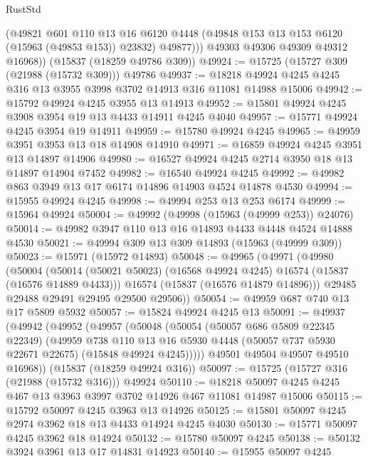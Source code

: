\begin{lexlean}{RustStd}
\begin{coremodule}
{\begin{coremodule}
{{{{{{{{{{{{{{{{{{{{{{{{{{{{{{{{{{{{{{{{{{{{{{{{{{{{{{{{{{{{            (@49821
              @601
              @110
              @13
              @16
              @6120
              @4448
              (@49848 @153 @13 @153 @6120 (@15963 (@49853 @153)) @23832)
              @49877)))
        @49303
        @49306
        @49309
        @49312
        @16968))
    (@15837 (@18259 @49786 @309))
@49924 := @15725 (@15727 @309 (@21988 (@15732 @309))) @49786
@49937 := @18218 @49924 @4245 @4245 @316 @13 @3955 @3998 @3702 @14913 @316 @11081 @14988 @15006
@49942 := @15792 @49924 @4245 @3955 @13 @14913
@49952 := @15801 @49924 @4245 @3908 @3954 @19 @13 @4433 @14911 @4245 @4040
@49957 := @15771 @49924 @4245 @3954 @19 @14911
@49959 := @15780 @49924 @4245
@49965 := @49959 @3951 @3953 @13 @18 @14908 @14910
@49971 := @16859 @49924 @4245 @3951 @13 @14897 @14906
@49980 := @16527 @49924 @4245 @2714 @3950 @18 @13 @14897 @14904 @7452
@49982 := @16540 @49924 @4245
@49992 := @49982 @863 @3949 @13 @17 @6174 @14896 @14903 @4524 @14878 @4530
@49994 := @15955 @49924 @4245
@49998 := @49994 @253 @13 @253 @6174
@49999 := @15964 @49924
@50004 := @49992 (@49998 (@15963 (@49999 @253)) @24076)
@50014 := @49982 @3947 @110 @13 @16 @14893 @4433 @4448 @4524 @14888 @4530
@50021 := @49994 @309 @13 @309 @14893 (@15963 (@49999 @309))
@50023 := @15971 (@15972 @14893)
@50048 := @49965
    (@49971
      (@49980
        (@50004
          (@50014 (@50021 @50023) (@16568 @49924 @4245) @16574 (@15837 (@16576 @14889 @4433)))
          @16574
          (@15837 (@16576 @14879 @14896)))
        @29485
        @29488
        @29491
        @29495
        @29500
        @29506))
@50054 := @49959 @687 @740 @13 @17 @5809 @5932
@50057 := @15824 @49924 @4245 @13
@50091 := @49937
    (@49942
      (@49952
        (@49957
          (@50048
            (@50054
              (@50057 @686 @5809 @22345 @22349)
              (@49959
                @738
                @110
                @13
                @16
                @5930
                @4448
                (@50057 @737 @5930 @22671 @22675)
                (@15848 @49924 @4245)))))
        @49501
        @49504
        @49507
        @49510
        @16968))
    (@15837 (@18259 @49924 @316))
@50097 := @15725 (@15727 @316 (@21988 (@15732 @316))) @49924
@50110 := @18218 @50097 @4245 @4245 @467 @13 @3963 @3997 @3702 @14926 @467 @11081 @14987 @15006
@50115 := @15792 @50097 @4245 @3963 @13 @14926
@50125 := @15801 @50097 @4245 @2974 @3962 @18 @13 @4433 @14924 @4245 @4030
@50130 := @15771 @50097 @4245 @3962 @18 @14924
@50132 := @15780 @50097 @4245
@50138 := @50132 @3924 @3961 @13 @17 @14831 @14923
@50140 := @15955 @50097 @4245
}}}}}}}}}}}}}}}}}}}}}}}}}}}}}}}}}}}}}}}}}}}}}}}}}}}}}}}}}}}}
\end{coremodule}}
\end{coremodule}
\end{lexlean}
